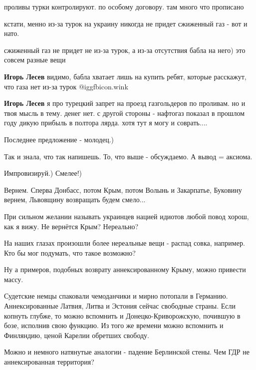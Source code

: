 \begin{itemize}
\begin{itemize}
проливы турки контролируют. по особому договору. там много что прописано

кстати, менно из-за турок на украину никогда не придет сжиженный газ - вот и нато.

сжиженный газ не придет не из-за турок, а из-за отсутствия бабла на него) это совсем разные вещи

\textbf{Игорь Лесев} видимо, бабла хватает лишь на купить ребят, которые расскажут, что газа нет из-за турок  @igg{fbicon.wink} 

\textbf{Игорь Лесев} я про турецкий запрет на проезд газгольдеров по проливам. но и твоя мысль в тему. денег нет. с другой стороны - нафтогаз показал в прошлом году дикую прибыль в полтора лярда. хотя тут я могу и соврать....

\end{itemize} %

Последнее предложение - молодец.)

\begin{itemize} %
Так и знала, что так напишешь. То, что выше - обсуждаемо. А вывод = аксиома.

Импровизируй.) Смелее!)
\end{itemize} %

Вернем. Сперва Донбасс, потом Крым, потом Волынь и Закарпатье, Буковину вернем, Львовщину возвращать будем смело...


При сильном желании называть украинцев нацией идиотов любой повод хорош, как я
вижу. Не вернётся Крым? Нереально?

На наших глазах произошли более нереальные вещи - распад совка, например. Кто
бы мог подумать, что такое возможно?

Ну а примеров, подобных возврату аннексированному Крыму, можно привести массу.

Судетские немцы спаковали чемоданчики и мирно потопали в Германию.
Аннексированные Латвия, Литва и Эстония сейчас свободные страны. Если копнуть
глубже, то можно вспомнить и Донецко-Криворожскую, почившую в бозе, исполнив
свою функцию. Из того же времени можно вспомнить и Финляндию, ценой Карелии
обретших свободу.

Можно и немного натянутые аналогии - падение Берлинской стены. Чем ГДР не
аннексированная территория?


\end{itemize}
